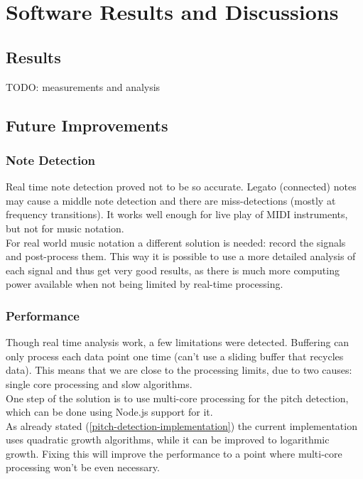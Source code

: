 \section{Software Results and Discussions}

\subsection{Results}
TODO: measurements and analysis

\subsection{Future Improvements}
\subsubsection{Note Detection}
Real time note detection proved not to be so accurate. Legato (connected) notes
may cause a middle note detection and there are miss-detections (mostly at frequency
transitions). It works well enough for live play of MIDI instruments, but not
for music notation. \\
For real world music notation a different solution is needed: record the signals
and post-process them. This way it is possible to use a more detailed analysis
of each signal and thus get very good results, as there is much more computing
power available when not being limited by real-time processing.

\subsubsection{Performance}
Though real time analysis work, a few limitations were detected. Buffering can only
process each data point one time (can't use a sliding buffer that recycles data).
This means that we are close to the processing limits, due to two causes: single
core processing and slow algorithms. \\
One step of the solution is to use multi-core processing for the pitch detection,
which can be done using Node.js support for it. \\
As already stated (\autoref{pitch-detection-implementation}) the current implementation
uses quadratic growth algorithms, while it can be improved to logarithmic
growth. Fixing this will improve the performance to a point where multi-core processing
won't be even necessary.
